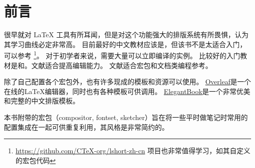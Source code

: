 \chapter{前言}

很早就对 {\LaTeX} 工具有所耳闻，但是对这个功能强大的排版系统有所畏惧，认为其学习曲线必定非常高。
目前最好的中文教材应该是\cite{LIU13}，但该书不是太适合入门，可以参考\cite{LSHORT}
\footnote{\url{https://github.com/CTeX-org/lshort-zh-cn} 项目也非常值得学习，如其自定义的宏包代码}。 对于初学者来说，需要大量可以立即编译的实例。 
比较好的入门教材是\cite{GUIDE}和\cite{COOKBOOK}。文献\cite{COMPANION}适合提高编辑能力。
文献\cite{CLSGUIDE}适合宏包和文档类编程参考。

除了自己配置各个宏包外，也有许多现成的模板和资源可以使用。
\href{https://www.overleaf.com}{Overleaf}是一个在线的{\LaTeX}编辑器，同时也有各种模板可供调用。
\href{https://github.com/ElegantLaTeX/ElegantBook}{ElegantBook}是一个非常优美和完整的中文排版模板。

本书附带的宏包（compositor, fontset, sketcher）旨在将一些平时做笔记时常用的配置集成在一起可供重复利用，其风格是非常简约的。
